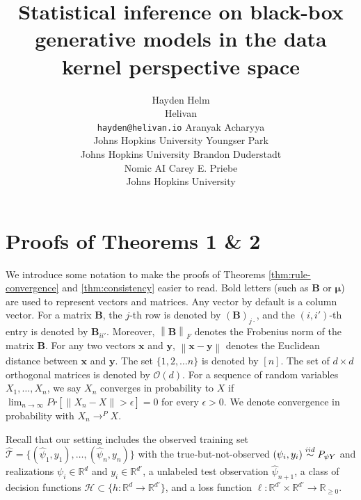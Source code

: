 \documentclass[11pt]{article}
\title{Statistical inference on black-box generative models in the data kernel perspective space}
\author{Hayden Helm \\
  Helivan \\ \texttt{hayden@helivan.io} \And Aranyak Acharyya \\
  Johns Hopkins University
  \And Youngser Park \\
  Johns Hopkins University 
  \AND Brandon Duderstadt \\
  Nomic AI
  \And Carey E. Priebe \\
  Johns Hopkins University}
\begin{document}
\maketitle





\label{introduction}


\label{method}


\label{experiments}



\clearpage

\appendix
\onecolumn

\section{Proofs of Theorems 1 \& 2}
\label{app:proofs}

We introduce some notation to make the proofs of Theorems \ref{thm:rule-convergence} and \ref{thm:consistency} easier to read.
Bold letters (such as $\mathbf{B}$ or $\boldsymbol{\mu}$) are used to represent vectors and matrices.
Any vector by default is a column vector. For a matrix $\mathbf{B}$, the $j$-th row is denoted by $(\mathbf{B})_{j \cdot}$, and the $(i,i')$-th entry is denoted by $\mathbf{B}_{i i'}$. Moreover, $\left\lVert \mathbf{B} \right\rVert_F$ denotes the Frobenius norm of the matrix $\mathbf{B}$. For any two vectors $\mathbf{x}$ and $\mathbf{y}$, $\left\lVert 
\mathbf{x}-\mathbf{y}
\right\rVert$ denotes the Euclidean distance between $\mathbf{x}$ and $\mathbf{y}$. 
 The set $\lbrace 1,2,\dots n \rbrace$ is denoted by $[n]$.
The set of $d \times d$ orthogonal matrices is denoted by $\mathcal{O}(d)$.
For a sequence of random variables $ X_{1}, \hdots, X_{n} $, we say $ X_{n} $ converges in probability to $ X $ if $ \lim_{n \to \infty}
Pr
\left[ 
\left\lVert 
X_n -X
\right\rVert > \epsilon
\right] =0
$
for every $ \epsilon > 0$. 
We denote convergence in probability with $ X_{n} \to^{P} X $.


Recall that our setting includes the observed training set $ \widehat{\mathcal{T}} = \{(\widehat{\psi}_{1}, y_{1}), \hdots, (\widehat{\psi}_{n}, y_{n})\} $ with the true-but-not-observed $ (\psi_{i}, y_{i}) \overset{iid}{\sim} P_{\psi Y} $ and realizations $ \psi_{i} \in \mathbb{R}^{d} $ and $ y_{i} \in \mathbb{R}^{d'} $, a unlabeled test observation $ \widehat{\psi}_{n+1} $, a class of decision functions $ \mathcal{H} \subset \{h: \mathbb{R}^{d} \to \mathbb{R}^{d'}\} $, and a loss function $ \ell: \mathbb{R}^{d'} \times \mathbb{R}^{d'} \to \mathbb{R}_{\ge 0} $.
\end{document}
